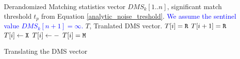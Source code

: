 \begin{algorithm}
\begin{algorithmic}[1]
\small
\Require Derandomized Matching statistics vector $DMS_k[1..n]$, significant match threshold $t_p$ from Equation \ref{analytic_noise_treshold}. \textcolor{blue}{We assume the sentinel value $DMS_k[n+1] = \infty$.}
\Ensure $T$, Tranlated DMS vector.%
\State $T[i] = {\tt R}$
\State $T[i+1] = {\tt R}$ 
 
    \State $T[i] \gets {\tt X}$
    \Else
    \State $T[i] \gets {\tt -}$
    \EndIf
\Else
    \State $T[i] = {\tt M}$ 
\EndIf
\EndFor
\caption{\small Translating the DMS vector} 
\label{alg:tranlating-DMS}
\end{algorithmic}
\end{algorithm}
